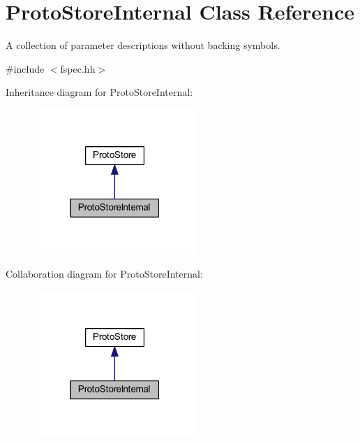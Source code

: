 \hypertarget{class_proto_store_internal}{}\section{Proto\+Store\+Internal Class Reference}
\label{class_proto_store_internal}


A collection of parameter descriptions without backing symbols.  




{\ttfamily \#include $<$fspec.\+hh$>$}



Inheritance diagram for Proto\+Store\+Internal\+:
\nopagebreak
\begin{figure}[H]
\begin{center}
\leavevmode
\includegraphics[width=175pt]{class_proto_store_internal__inherit__graph}
\end{center}
\end{figure}


Collaboration diagram for Proto\+Store\+Internal\+:
\nopagebreak
\begin{figure}[H]
\begin{center}
\leavevmode
\includegraphics[width=175pt]{class_proto_store_internal__coll__graph}
\end{center}
\end{figure}
